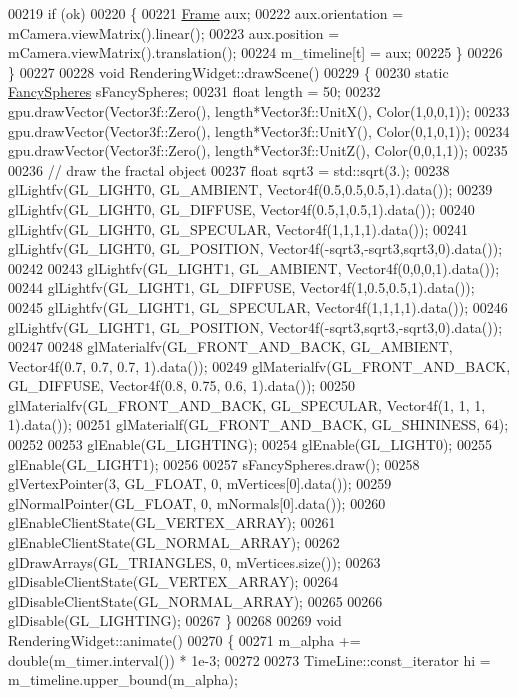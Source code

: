 \begin{DoxyCode}
00219     \textcolor{keywordflow}{if} (ok)
00220     \{
00221       \hyperlink{class_frame}{Frame} aux;
00222       aux.orientation = mCamera.viewMatrix().linear();
00223       aux.position = mCamera.viewMatrix().translation();
00224       m\_timeline[t] = aux;
00225     \}
00226 \}
00227 
00228 \textcolor{keywordtype}{void} RenderingWidget::drawScene()
00229 \{
00230   \textcolor{keyword}{static} \hyperlink{class_fancy_spheres}{FancySpheres} sFancySpheres;
00231   \textcolor{keywordtype}{float} length = 50;
00232   gpu.drawVector(Vector3f::Zero(), length*Vector3f::UnitX(), Color(1,0,0,1));
00233   gpu.drawVector(Vector3f::Zero(), length*Vector3f::UnitY(), Color(0,1,0,1));
00234   gpu.drawVector(Vector3f::Zero(), length*Vector3f::UnitZ(), Color(0,0,1,1));
00235 
00236   \textcolor{comment}{// draw the fractal object}
00237   \textcolor{keywordtype}{float} sqrt3 = std::sqrt(3.);
00238   glLightfv(GL\_LIGHT0, GL\_AMBIENT, Vector4f(0.5,0.5,0.5,1).data());
00239   glLightfv(GL\_LIGHT0, GL\_DIFFUSE, Vector4f(0.5,1,0.5,1).data());
00240   glLightfv(GL\_LIGHT0, GL\_SPECULAR, Vector4f(1,1,1,1).data());
00241   glLightfv(GL\_LIGHT0, GL\_POSITION, Vector4f(-sqrt3,-sqrt3,sqrt3,0).data());
00242 
00243   glLightfv(GL\_LIGHT1, GL\_AMBIENT, Vector4f(0,0,0,1).data());
00244   glLightfv(GL\_LIGHT1, GL\_DIFFUSE, Vector4f(1,0.5,0.5,1).data());
00245   glLightfv(GL\_LIGHT1, GL\_SPECULAR, Vector4f(1,1,1,1).data());
00246   glLightfv(GL\_LIGHT1, GL\_POSITION, Vector4f(-sqrt3,sqrt3,-sqrt3,0).data());
00247 
00248   glMaterialfv(GL\_FRONT\_AND\_BACK, GL\_AMBIENT, Vector4f(0.7, 0.7, 0.7, 1).data());
00249   glMaterialfv(GL\_FRONT\_AND\_BACK, GL\_DIFFUSE, Vector4f(0.8, 0.75, 0.6, 1).data());
00250   glMaterialfv(GL\_FRONT\_AND\_BACK, GL\_SPECULAR, Vector4f(1, 1, 1, 1).data());
00251   glMaterialf(GL\_FRONT\_AND\_BACK, GL\_SHININESS, 64);
00252 
00253   glEnable(GL\_LIGHTING);
00254   glEnable(GL\_LIGHT0);
00255   glEnable(GL\_LIGHT1);
00256 
00257   sFancySpheres.draw();
00258   glVertexPointer(3, GL\_FLOAT, 0, mVertices[0].data());
00259   glNormalPointer(GL\_FLOAT, 0, mNormals[0].data());
00260   glEnableClientState(GL\_VERTEX\_ARRAY);
00261   glEnableClientState(GL\_NORMAL\_ARRAY);
00262   glDrawArrays(GL\_TRIANGLES, 0, mVertices.size());
00263   glDisableClientState(GL\_VERTEX\_ARRAY);
00264   glDisableClientState(GL\_NORMAL\_ARRAY);
00265 
00266   glDisable(GL\_LIGHTING);
00267 \}
00268 
00269 \textcolor{keywordtype}{void} RenderingWidget::animate()
00270 \{
00271   m\_alpha += double(m\_timer.interval()) * 1e-3;
00272 
00273   TimeLine::const\_iterator hi = m\_timeline.upper\_bound(m\_alpha);

\end{DoxyCode}
